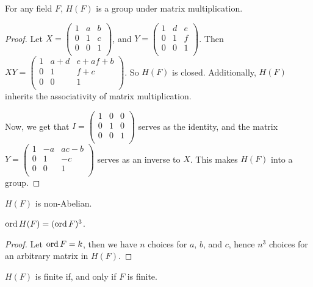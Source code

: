 \begin{lemma}\label{lemma_1.4.4}
  For any field $F$,  $H(F)$ is a group under matrix multiplication.
\end{lemma}
\begin{proof}
  Let $X=\begin{pmatrix}
    1   &   a   &   b   \\
    0   &   1   &   c   \\
    0   &   0   &   1   \\
  \end{pmatrix}$, and
  $Y=\begin{pmatrix}
    1   &   d   &   e   \\
    0   &   1   &   f   \\
    0   &   0   &   1   \\
  \end{pmatrix}$. Then
  $XY=\begin{pmatrix}
    1   &  a+d  &   e+af+b  \\
    0   &   1   &   f+c     \\
    0   &   0   &   1   \\
  \end{pmatrix}$.
  So $H(F)$ is closed. Additionally, $H(F)$ inherits the associativity of
  matrix multiplication.

  Now, we get that $I=\begin{pmatrix}
    1    &   0   &   0   \\
    0    &   1   &   0   \\
    0    &   0   &   1   \\
  \end{pmatrix}$
  serves as the identity, and the matrix $Y=\begin{pmatrix}
    1   &  -a   &   ac-b    \\
    0   &   1   &   -c      \\
    0   &   0   &   1       \\
  \end{pmatrix}$
  serves as an inverse to $X$. This makes  $H(F)$ into a group.
\end{proof}
\begin{corollary}
  $H(F)$ is non-Abelian.
\end{corollary}
\begin{corollary}
  $\operatorname{ord}{H(F)}=(\operatorname{ord}{F})^3$.
\end{corollary}
\begin{proof}
  Let $\operatorname{ord}{F}=k$, then we have $n$ choices for  $a$,  $b$, and  $c$, hence
  $n^3$ choices for an arbitrary matrix in  $H(F)$.
\end{proof}
\begin{corollary}
  $H(F)$ is finite if, and only if $F$ is finite.
\end{corollary}
